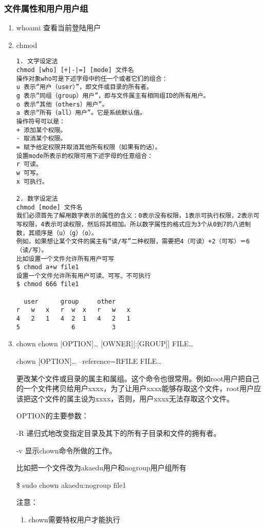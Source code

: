 \documentclass[11pt]{article}
\begin{document}
\subsubsection{文件属性和用户用户组}
\label{sec-1-1-3}
\begin{enumerate}
\item whoami
\label{sec-1-1-3-1}
查看当前登陆用户
\item chmod
\label{sec-1-1-3-2}
\begin{verbatim}
1. 文字设定法 
chmod [who] [+|-|=] [mode] 文件名
操作对象who可是下述字母中的任一个或者它们的组合： 
u 表示“用户（user）”，即文件或目录的所有者。 
g 表示“同组（group）用户”，即与文件属主有相同组ID的所有用户。 
o 表示“其他（others）用户”。 
a 表示“所有（all）用户”。它是系统默认值。 
操作符号可以是： 
+ 添加某个权限。 
- 取消某个权限。 
= 赋予给定权限并取消其他所有权限（如果有的话）。 
设置mode所表示的权限可用下述字母的任意组合： 
r 可读。 
w 可写。 
x 可执行。 

2. 数字设定法 
chmod [mode] 文件名
我们必须首先了解用数字表示的属性的含义：0表示没有权限，1表示可执行权限，2表示可写权限，4表示可读权限，然后将其相加。所以数字属性的格式应为3个从0到7的八进制数，其顺序是（u）（g）（o）。 
例如，如果想让某个文件的属主有“读/写”二种权限，需要把4（可读）+2（可写）＝6（读/写）。 
比如设置一个文件允许所有用户可写 
$ chmod a+w file1
设置一个文件允许所有用户可读、可写、不可执行 
$ chmod 666 file1

  user      group     other
r   w   x   r  w  x   r   w   x   
4   2   1   4  2  1   4   2   1   
5              6          3
\end{verbatim}
\item chown
\label{sec-1-1-3-3}
chown [OPTION]\ldots{} [OWNER][:[GROUP]] FILE\ldots{}

chown [OPTION]\ldots{} --reference=RFILE FILE\ldots{}

更改某个文件或目录的属主和属组。这个命令也很常用。例如root用户把自己的一个文件拷贝给用户xxxx，为了让用户xxxx能够存取这个文件，root用户应该把这个文件的属主设为xxxx，否则，用户xxxx无法存取这个文件。 

OPTION的主要参数： 

-R 递归式地改变指定目录及其下的所有子目录和文件的拥有者。 

-v 显示chown命令所做的工作。 

比如把一个文件改为akaedu用户和nogroup用户组所有 

\$ sudo chown akaedu:nogroup file1

注意： 

\begin{enumerate}
\item chown需要特权用户才能执行


\end{enumerate}
\end{enumerate}
\end{document}
